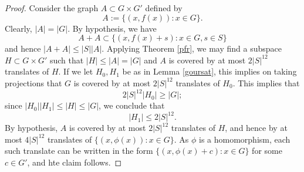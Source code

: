 \begin{proof} \leanok Consider the graph $A \subset G \times G'$ defined by
$$ A := \{ (x,f(x)): x \in G \}.$$
Clearly, $|A| = |G|$.  By hypothesis, we have
$$ A+A \subset \{ (x,f(x)+s): x \in G, s \in S\}$$
and hence $|A+A| \leq |S| |A|$.  Applying Theorem \ref{pfr}, we may find a subspace $H \subset G \times G'$ such that $|H| \leq |A|=|G|$ and $A$ is covered by at most $2|S|^{12}$ translates of $H$.  If we let $H_0,H_1$ be as in Lemma \ref{goursat}, this implies on taking projections that $G$ is covered by at most $2|S|^{12}$ translates of $H_0$.  This implies that
$$ 2|S|^{12} |H_0| \geq |G|;$$
since $|H_0| |H_1| \leq |H| \leq |G|$, we conclude that
$$ |H_1| \leq 2|S|^{12}.$$
By hypothesis, $A$ is covered by at most $2|S|^{12}$ translates of $H$, and hence by at most $4|S|^{12}$ translates of $\{ (x,\phi(x)): x \in G \}$.  As $\phi$ is a homomorphism, each such translate can be written in the form $\{ (x,\phi(x)+c): x \in G \}$ for some $c \in G'$, and hte claim follows.
\end{proof}
